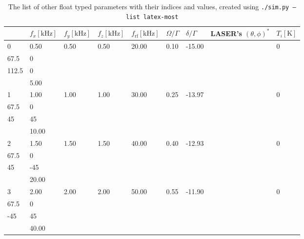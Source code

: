 \begin{longtable}{lllllllrl}
\caption{The list of other float typed parameters with their indices and values, created using \texttt{./sim.py --list latex-most}}\label{tbl:sim-list-most} \\
\hline
    & $f_x \mathrm{[kHz]}$   & $f_y \mathrm{[kHz]}$   & $f_z \mathrm{[kHz]}$   & $f_\mathrm{rf} \mathrm{[kHz]}$   & $\Omega/\Gamma$   & $\delta/\Gamma$   &                                                           LASER's $(\theta,\phi)^*$ & $T_i \mathrm{[K]}$   \\ \hline
\hline \hline
 0  & 0.50                   & 0.50                   & 0.50                   & 20.00                            & 0.10              & -15.00            &       \begin{tabular}{lr}   0     & 0 \\  67.5  & 0 \\  112.5 & 0 \\  \end{tabular} & 5.00                 \\ \hline
 1  & 1.00                   & 1.00                   & 1.00                   & 30.00                            & 0.25              & -13.97            &       \begin{tabular}{lr}   0    &  0 \\  67.5 &  0 \\  45   & 45 \\  \end{tabular} & 10.00                \\ \hline
 2  & 1.50                   & 1.50                   & 1.50                   & 40.00                            & 0.40              & -12.93            &    \begin{tabular}{lr}   0    &   0 \\  67.5 &   0 \\  45   & -45 \\  \end{tabular} & 20.00                \\ \hline
 3  & 2.00                   & 2.00                   & 2.00                   & 50.00                            & 0.55              & -11.90            &       \begin{tabular}{lr}   0    &  0 \\  67.5 &  0 \\  -45  & 45 \\  \end{tabular} & 40.00                \\ \hline

\end{longtable}
